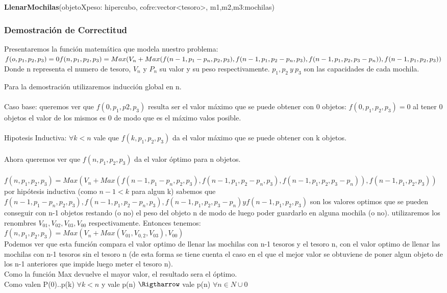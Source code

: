 \documentclass[spanish,12pt]{article}
\begin{document}
\begin{algorithm}[H]{\textbf{LlenarMochilas}(objetoXpeso: hipercubo, cofre:vector<tesoro>, m1,m2,m3:mochilas)}
\begin{algorithmic}[1]
\begin{algorithmic}
\subsubsection{Demostración de Correctitud}
Presentaremos la función matemática que modela nuestro problema:\\

$f(o,p_{1},p_{2},p_{3})=0 \\
f(n,p_{1},p_{2},p_{3}) = Max(V_{n}+Max(f(n-1,p_{1}-p_{n},p_{2},p_{3}), f(n-1,p_{1},p_{2}-p_{n},p_{3}), f(n-1,p_{1},p_{2},p_{3}-p_{n})),f(n-1,p_{1},p_{2},p_{3})) $
\\
Donde n representa el numero de tesoro, $V_{n}$ y $P_{n}$ su valor y su peso respectivamente. $p_{1},p_{2}\ y \ p_{3}$ son las capacidades de cada mochila. 

Para la demostración utilizaremos inducción global en n.
\\
\\
Caso base: queremos ver que $f(0,p_{1},p{2},p_{3})$ resulta ser el valor máximo que se puede obtener con 0 objetos:
$f(0,p_{1},p_{2},p_{3}) = 0$ al tener 0 objetos el valor de los mismos es 0 de modo que es el máximo valos posible. 
\\
\\
Hipotesis Inductiva: $\forall k<n$ vale que $f(k,p_{1},p_{2},p_{3})$ da el valor máximo que se puede obtener con k objetos.
\\
\\
Ahora queremos ver que $f(n,p_{1},p_{2},p_{3})$ da el valor óptimo para n objetos.
\\
\\
$f(n,p_{1},p_{2},p_{3}) = Max(V_{n}+Max(f(n-1,p_{1}-p_{n},p_{2},p_{3}), f(n-1,p_{1},p_{2}-p_{n},p_{3}), f(n-1,p_{1},p_{2},p_{3}-p_{n})),f(n-1,p_{1},p_{2},p_{3})) $ \\
por hipótesis inductiva (como $n-1 < k$ para algun k) sabemos que $f(n-1,p_{1}-p_{n},p_{2},p_{3}), f(n-1,p_{1},p_{2}-p_{n},p_{3}), f(n-1,p_{1},p_{2},p_{3}-p_{n}) y f(n-1,p_{1},p_{2},p_{3})$ son los valores optimos que se pueden conseguir con n-1 objetos restando (o no) el peso del objeto n de modo de luego poder guardarlo en alguna mochila (o no). utilizaremos los renombres $V_{01},V_{02},V_{03},V_{00}$ respectivamente.
Entonces tenemos: \\
$f(n,p_{1},p_{2},p_{3})= Max(V_{n}+Max(V_{01},V_{0,2},V_{03}),V_{00})$\\
Podemos ver que esta función  compara el valor optimo de llenar las mochilas con n-1 tesoros y el tesoro n, con el valor optimo de llenar las mochilas con n-1 tesoros sin el tesoro n (de esta forma se tiene cuenta el caso en el que el mejor valor se obtuviene de poner algun objeto  de los n-1 anteriores que impide luego meter el tesoro n).\\
Como la función Max devuelve el mayor valor, el resultado sera el óptimo.
\\
Como valen P(0)..p(k) $\forall k<n$ y vale p(n) $\Rigtharrow$ vale p(n) $\forall n \in N \cup {0} $


\end{algorithmic}
\end{algorithmic}
\end{algorithm}
\end{document}
